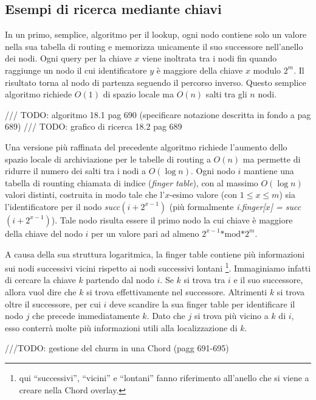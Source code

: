 \subsection{Esempi di ricerca mediante chiavi}\label{esempi-di-ricerca-mediante-chiavi}

In un primo, semplice, algoritmo per il lookup, ogni nodo contiene solo un valore nella sua tabella di routing e memorizza unicamente il suo successore nell'anello dei nodi. Ogni query per la chiave $x$ viene inoltrata tra i nodi fin quando raggiunge un nodo il cui identificatore $y$ è maggiore della chiave $x$ modulo $2^m$. Il risultato torna al nodo di partenza seguendo il percorso inverso. Questo semplice algoritmo richiede $O(1)$ di spazio locale ma $O(n)$ salti tra gli $n$ nodi.

/// TODO: algoritmo 18.1 pag 690 (specificare notazione descritta in fondo a pag 689) /// TODO: grafico di ricerca 18.2 pag 689

Una versione più raffinata del precedente algoritmo richiede l'aumento dello spazio locale di archiviazione per le tabelle di routing a $O(n)$ ma permette di ridurre il numero dei salti tra i nodi a $O(\log n)$. Ogni nodo $i$ mantiene una tabella di rounting chiamata di indice (\emph{finger table}), con al massimo $O(\log n)$ valori distinti, costruita in modo tale che l'$x$-esimo valore (con $1 \leq x \leq m$) sia l'identificatore per il nodo \emph{succ}$(i + 2^{x-1})$ (più formalmente \emph{i.finger{[}$x${]} = succ}$(i + 2^{x-1})$). Tale nodo risulta essere il primo nodo la cui chiave è maggiore della chiave del nodo $i$ per un valore pari ad almeno $2^{x-1}\text{*mod*}2^m$.

A causa della sua struttura logaritmica, la finger table contiene più informazioni sui nodi successivi vicini rispetto ai nodi successivi lontani \footnote{qui ``successivi'', ``vicini'' e ``lontani'' fanno   riferimento all'anello che si viene a creare nella Chord overlay.}. Immaginiamo infatti di cercare la chiave $k$ partendo dal nodo $i$. Se $k$ si trova tra $i$ e il suo successore, allora vuol dire che $k$ si trova effettivamente nel successore. Altrimenti $k$ si trova oltre il successore, per cui $i$ deve scandire la sua finger table per identificare il nodo $j$ che precede immediatamente $k$. Dato che $j$ si trova più vicino a $k$ di $i$, esso conterrà molte più informazioni utili alla localizzazione di $k$.

///TODO: gestione del churm in una Chord (pagg 691-695)
